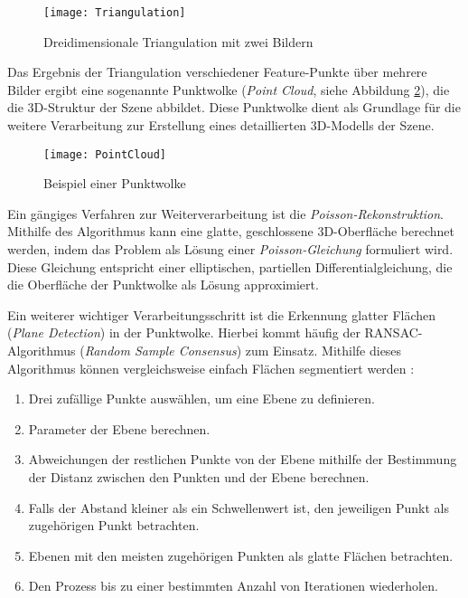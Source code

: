 \begin{figure}[h]
    \centering
    \texttt{[image: Triangulation]}
    \caption{Dreidimensionale Triangulation mit zwei Bildern \cite{gao2021vSLAM}\label{fig:Triangulation}}\par
\end{figure}

Das Ergebnis der Triangulation verschiedener Feature-Punkte über mehrere Bilder ergibt eine sogenannte Punktwolke (\emph{Point Cloud}, siehe Abbildung \ref{fig:PointCloud}), die die 3D-Struktur der Szene abbildet. Diese Punktwolke dient als Grundlage für die weitere Verarbeitung zur Erstellung eines detaillierten 3D-Modells der Szene.

\begin{figure}[h]
    \centering
    \texttt{[image: PointCloud]}
    \caption{Beispiel einer Punktwolke \cite{open3d2025pointcloud}\label{fig:PointCloud}}\par
\end{figure}

Ein gängiges Verfahren zur Weiterverarbeitung ist die \emph{Poisson-Rekonstruktion}. Mithilfe des Algorithmus kann eine glatte, geschlossene 3D-Oberfläche berechnet werden, indem das Problem als Lösung einer \emph{Poisson-Gleichung} formuliert wird. Diese Gleichung entspricht einer elliptischen, partiellen Differentialgleichung, die die Oberfläche der Punktwolke als Lösung approximiert. \cite{kazhdan2006poisson}

Ein weiterer wichtiger Verarbeitungsschritt ist die Erkennung glatter Flächen (\emph{Plane Detection}) in der Punktwolke. Hierbei kommt häufig der RANSAC-Algorithmus (\emph{Random Sample Consensus}) zum Einsatz. Mithilfe dieses Algorithmus können vergleichsweise einfach Flächen segmentiert werden \cite{yang2010planeDetection, ajith2020ransac}:

\begin{enumerate}
    \item Drei zufällige Punkte auswählen, um eine Ebene zu definieren.
    \item Parameter der Ebene berechnen.
    \item Abweichungen der restlichen Punkte von der Ebene mithilfe der Bestimmung der Distanz zwischen den Punkten und der Ebene berechnen.
    \item Falls der Abstand kleiner als ein Schwellenwert ist, den jeweiligen Punkt als zugehörigen Punkt betrachten.
    \item Ebenen mit den meisten zugehörigen Punkten als glatte Flächen betrachten.
    \item Den Prozess bis zu einer bestimmten Anzahl von Iterationen wiederholen.
\end{enumerate}

